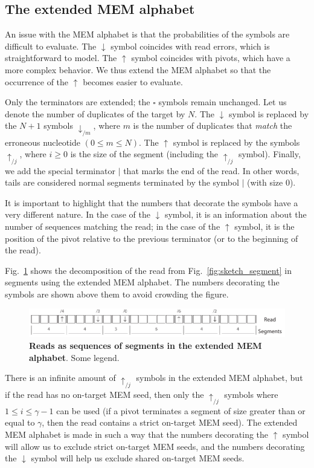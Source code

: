 \documentclass{article}
\begin{document}
\subsection{The extended MEM alphabet}

An issue with the MEM alphabet is that the probabilities of the symbols
are difficult to evaluate. The $\downarrow$ symbol coincides with read
errors, which is straightforward to model. The $\uparrow$ symbol coincides
with pivots, which have a more complex behavior. We thus extend the MEM
alphabet so that the occurrence of the $\uparrow$ becomes easier to
evaluate.

Only the terminators are extended; the $\square$ symbols remain unchanged.
Let us denote the number of duplicates of the target by $N$. The
$\downarrow$ symbol is replaced by the $N+1$ symbols
$\downarrow_{/m}$, where $m$ is the number of duplicates that
\emph{match} the erroneous nucleotide $(0 \leq m \leq N)$. The $\uparrow$
symbol is replaced by the symbols $\uparrow_{/j}$, where $i
\geq 0$ is the size of the segment (including the
$\uparrow_{/j}$ symbol). Finally, we add the special terminator
$|$ that marks the end of the read. In other words, tails are considered
normal segments terminated by the symbol $|$ (with size 0).

It is important to highlight that the numbers that decorate the symbols
have a very different nature. In the case of the $\downarrow$ symbol, it
is an information about the number of sequences matching the read; in the
case of the $\uparrow$ symbol, it is the position of the pivot relative to
the previous terminator (or to the beginning of the read).

Fig.~\ref{fig:sketch_extended} shows the decomposition of the read from
Fig.~\ref{fig:sketch_segment} in segments using the extended MEM alphabet.
The numbers decorating the symbols are shown above them to avoid crowding
the figure.

\begin{figure}[h]
\centering
\includegraphics[scale=.85]{sketch_extended.pdf}
\caption{\textbf{Reads as sequences of segments in the extended MEM
alphabet}. 
Some legend.}
\label{fig:sketch_extended}
\end{figure}

There is an infinite amount of $\uparrow_{/j}$ symbols in the
extended MEM alphabet, but if the read has no on-target MEM seed, then
only the $\uparrow_{/j}$ symbols where $1 \leq i \leq \gamma-1$
can be used (if a pivot terminates a segment of size greater than or equal
to $\gamma$, then the read contains a strict on-target MEM seed). The
extended MEM alphabet is made in such a way that the numbers decorating
the $\uparrow$ symbol will allow us to exclude strict on-target MEM seeds,
and the numbers decorating the $\downarrow$ symbol will help us exclude
shared on-target MEM seeds.
\end{document}
